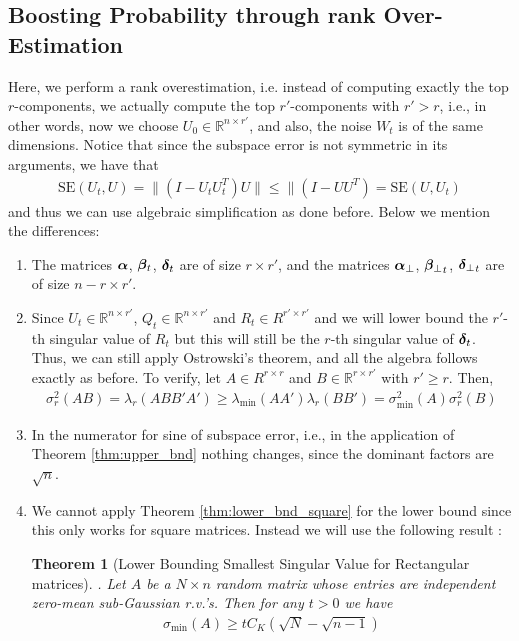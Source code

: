 \documentclass[10pt]{article}
\newcommand{\R}{\mathbb{R}}
\newtheorem{theorem}{Theorem}
\newcommand{\SE}{\mathrm{SE}}
\begin{document}
\subsection{Boosting Probability through rank Over-Estimation}
Here, we perform a rank overestimation, i.e. instead of computing exactly the top $r$-components, we actually compute the top $r'$-components with $r' > r$, i.e., in other words, now we choose $U_0 \in \R^{n \times r'}$, and also, the noise $W_t$ is of the same dimensions. Notice that since the subspace error is not symmetric in its arguments, we have that 
\begin{align*}
\SE(U_t, U) = \|(I  - U_t U_t^T) U\| \leq \|(I - U U^T) = \SE(U, U_t)
\end{align*}
and thus we can use algebraic simplification as done before. Below we mention the differences:
\begin{enumerate}
\item The matrices $\bm{\alpha}$, $\bm{\beta}_t$, $\bm{\delta}_t$ are of size $r \times r'$, and the matrices $\bm{\alpha}_{\perp}$, ${\bm{\beta}_{\perp}}_t$, ${\bm{\delta}_{\perp}}_t$ are of size $n - r \times r'$.
\item Since $U_t \in \R^{n \times r'}$, $Q_t \in \R^{n \times r'}$ and $R_t \in R^{r' \times r'}$ and we will lower bound the $r'$-th singular value of $R_t$ but this will still be the $r$-th singular value of $\bm{\delta}_t$. Thus, we can still apply Ostrowski's theorem, and all the algebra follows exactly as before. To verify, let $A \in R^{r \times r}$ and $B \in \R^{r \times r'}$ with $r' \geq r$. Then, 
\begin{align*}
\sigma_{r}^2(AB) = \lambda_{r}(ABB'A') \geq \lambda_{\min}(AA') \lambda_{r}(BB') = \sigma_{\min}^2(A) \sigma_{r}^2(B)
\end{align*}
\item In the numerator for sine of subspace error, i.e., in the application of Theorem \ref{thm:upper_bnd} nothing changes, since the dominant factors are $\sqrt{n}$. 
\item We cannot apply Theorem \ref{thm:lower_bnd_square} for the lower bound since this only works for square matrices. Instead we will use the following result \cite[Theorem 1.1]{smallest_rect}:
\begin{theorem}[Lower Bounding Smallest Singular Value for Rectangular matrices]\label{thm:lower_bnd_rect}.
Let $A$ be a $N \times n$ random matrix whose entries are independent zero-mean sub-Gaussian r.v.'s. Then for any $t >0$ we have 
\begin{align*}
\sigma_{\min}(A) \geq t C_K(\sqrt{N} - \sqrt{n-1}) 

\end{align*}
\end{theorem}
\end{enumerate}
\end{document}
